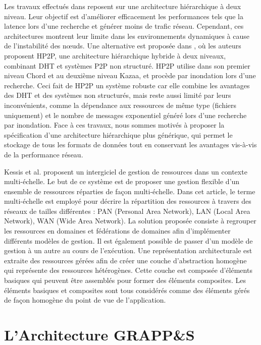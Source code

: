 Les travaux effectués dans \cite{Ji10,Erice04,Ratnasamy01} reposent sur une architecture hiérarchique à deux niveau. Leur objectif est d'améliorer efficacement les performances tels que la latence lors d'une recherche et générer moins de trafic réseau. Cependant, ces architectures montrent leur limite dans les environnements dynamiques à cause de l'instabilité des n{\oe}uds. Une alternative est proposée dans \cite{Peng07}, où les auteurs proposent HP2P, une architecture hiérarchique hybride à deux niveaux, combinant DHT et systèmes P2P non structuré. HP2P utilise dans son premier niveau Chord et au deuxième niveau Kazaa, et procède par inondation lors d'une recherche. Ceci fait de HP2P un système robuste car elle combine les avantages des DHT et des systèmes non structurés, mais reste aussi limité par leurs inconvénients, comme la dépendance aux ressources de même type (fichiers uniquement) et le nombre de messages exponentiel généré lors d'une recherche par inondation. Face à ces travaux, nous sommes motivés à proposer la spécification d'une architecture hiérarchique plus générique, qui permet le stockage de tous les formats de données tout en conservant les avantages vis-à-vis de la performance réseau.

Kessis et al. \cite{Kessis09} proposent un intergiciel de gestion de ressources dans un contexte multi-échelle. Le but de ce système est de proposer une gestion flexible d'un ensemble de ressources réparties de façon multi-échelle. Dans cet article, le terme multi-échelle est employé pour décrire la répartition des ressources à travers des réseaux de tailles différentes : PAN (Personal Area Network), LAN (Local Area Network), WAN (Wide Area Network). La solution proposée consiste à regrouper les ressources en domaines et fédérations de domaines afin d'implémenter différents modèles de gestion. Il est également possible de passer d'un modèle de gestion à un autre au cours de l'exécution.
Une représentation architecturale est extraite des ressources gérées afin de créer une couche d'abstraction homogène qui représente des ressources hétérogènes. Cette couche est composée d'éléments basiques qui peuvent être assemblés pour former des éléments composites. Les éléments basiques et composites sont tous considérés comme des éléments gérés de façon homogène du point de vue de l'application.



\section{L'Architecture GRAPP\&S \label{SEC:GRAPPES}}

